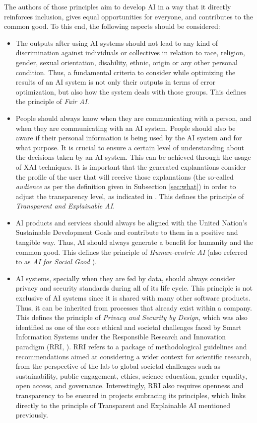 \documentclass[final]{elsarticle}
\begin{document}
The authors of those principles aim to develop AI in a way that it directly reinforces inclusion, gives equal opportunities for everyone, and contributes to the common good. To this end, the following aspects should be considered:
\begin{itemize}[leftmargin=*]
\item The outputs after using AI systems should not lead to any kind of discrimination against individuals or collectives in relation to race, religion, gender, sexual orientation, disability, ethnic, origin or any other personal condition. Thus, a fundamental criteria to consider while optimizing the results of an AI system is not only their outputs in terms of error optimization, but also how the system deals with those groups. This defines the principle of \textit{Fair AI}.  

\item People should always know when they are communicating with a person, and when they are communicating with an AI system. People should also be aware if their personal information is being used by the AI system and for what purpose. It is crucial to ensure a certain level of understanding about the decisions taken by an AI system. This can be achieved through the usage of XAI techniques. It is important that the generated explanations consider the profile of the user that will receive those explanations (the so-called \emph{audience} as per the definition given in Subsection \ref{sec:what}) in order to adjust the transparency level, as indicated in \cite{theodorou2017designing}. This defines the principle of \textit{Transparent and Explainable AI}.

\item AI products and services should always be aligned with the United Nation's Sustainable Development Goals \cite{RePEc:ess:wpaper:id:7559} and contribute to them in a positive and tangible way. Thus, AI should always generate a benefit for humanity and the common good. This defines the principle of \textit{Human-centric AI} (also referred to as \textit{AI for Social Good} \cite{Hager:19}).

\item AI systems, specially when they are fed by data, should always consider privacy and security standards during all of its life cycle. This principle is not exclusive of AI systems since it is shared with many other software products. Thus, it can be inherited from processes that already exist within a company. This defines the principle of \textit{Privacy and Security by Design}, which was also identified as one of the core ethical and societal challenges faced by Smart Information Systems under the Responsible Research and Innovation paradigm (RRI, \cite{stahl2018ethics}). RRI refers to a package of methodological guidelines and recommendations aimed at considering a wider context for scientific research, from the perspective of the lab to global societal challenges such as sustainability, public engagement, ethics, science education, gender equality, open access, and governance. Interestingly, RRI also requires openness and transparency to be ensured in projects embracing its principles, which links directly to the principle of Transparent and Explainable AI mentioned previously.


\end{itemize}
\end{document}
